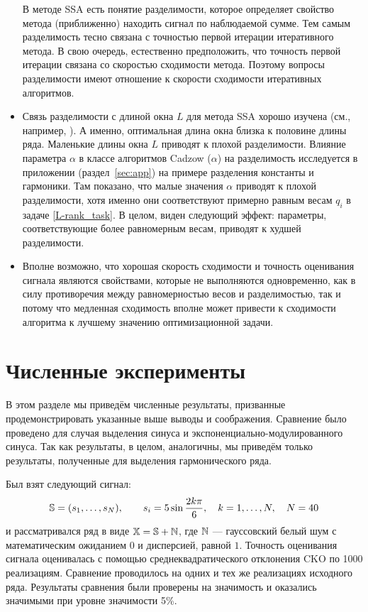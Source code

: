 \documentclass[12pt,a4paper,fleqn,leqno]{article}
\begin{document}
\begin{itemize}
В методе SSA есть понятие разделимости, которое определяет свойство метода (приближенно) находить сигнал по наблюдаемой сумме. Тем самым разделимость
тесно связана с точностью первой итерации итеративного метода. В свою очередь, естественно предположить, что точность первой итерации связана со скоростью сходимости метода. Поэтому вопросы разделимости имеют отношение к скорости сходимости итеративных алгоритмов. 
\item
Связь разделимости с длиной окна $L$ для метода SSA хорошо изучена (см., например, \cite{Golyandina2010}). А именно, оптимальная длина окна близка
к половине длины ряда. Маленькие длины окна $L$ приводят к плохой разделимости. Влияние параметра $\alpha$ в классе алгоритмов 
Cadzow ($\alpha$) на разделимость исследуется в приложении (раздел~\ref{sec:app}) на примере разделения константы и гармоники. Там показано, что малые значения
$\alpha$ приводят к плохой разделимости, хотя именно они соответствуют примерно равным весам $q_i$ в задаче \eqref{L-rank_task}.
В целом, виден следующий эффект: параметры, соответствующие более равномерным весам, приводят к худшей разделимости.
\item
Вполне возможно, что хорошая скорость сходимости и точность оценивания сигнала являются свойствами, которые не выполняются одновременно, как в силу 
противоречия между равномерностью весов и разделимостью, так и потому что медленная сходимость вполне может привести к сходимости алгоритма к лучшему значению оптимизационной задачи.
\end{itemize}

\section{Численные эксперименты}
\label{sec:simul}
В этом разделе мы приведём численные результаты, призванные продемонстрировать указанные выше выводы и соображения.
Сравнение было проведено для случая выделения синуса и экспоненциально-модулированного синуса.
Так как результаты, в целом, аналогичны, мы приведём только результаты, полученные для выделения гармонического ряда.

Был взят следующий сигнал:
\begin{equation*}
\mathbb{S} = (s_{1}, \ldots, s_N), \qquad s_{i} = 5\sin{\frac{2 k \pi}{6}}, \quad k = 1, \ldots, N, \quad N = 40
\end{equation*}
и рассматривался ряд в виде $\mathbb{X} = \mathbb{S} + \mathbb{N}$, где  $\mathbb{N}$ --- гауссовский белый шум с математическим ожиданием $0$ и дисперсией, равной $1$.
Точность оценивания сигнала оценивалась с помощью среднеквадратического отклонения CKO по 1000 реализациям.
Сравнение проводилось на одних и тех же реализациях исходного ряда. Результаты сравнения были проверены на значимость и оказались значимыми 
при уровне значимости 5\%. %
\end{document}
